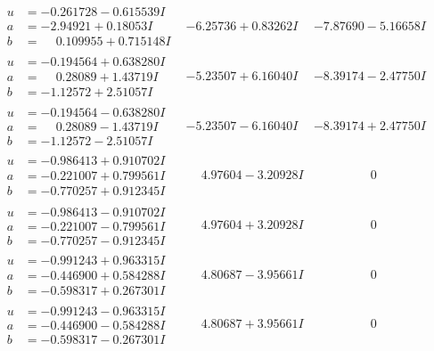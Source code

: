 \documentclass[1p]{elsarticle_modified}
\theoremstyle{definition}
\begin{document}
$$\begin{array}{c|c|c}
\begin{aligned}
u &= -0.261728 - 0.615539 I \\
a &= -2.94921 + 0.18053 I \\
b &= \phantom{-}0.109955 + 0.715148 I\end{aligned}
 & -6.25736 + 0.83262 I & -7.87690 - 5.16658 I \\ \hline\begin{aligned}
u &= -0.194564 + 0.638280 I \\
a &= \phantom{-}0.28089 + 1.43719 I \\
b &= -1.12572 + 2.51057 I\end{aligned}
 & -5.23507 + 6.16040 I & -8.39174 - 2.47750 I \\ \hline\begin{aligned}
u &= -0.194564 - 0.638280 I \\
a &= \phantom{-}0.28089 - 1.43719 I \\
b &= -1.12572 - 2.51057 I\end{aligned}
 & -5.23507 - 6.16040 I & -8.39174 + 2.47750 I \\ \hline\begin{aligned}
u &= -0.986413 + 0.910702 I \\
a &= -0.221007 + 0.799561 I \\
b &= -0.770257 + 0.912345 I\end{aligned}
 & \phantom{-}4.97604 - 3.20928 I & \phantom{-0.000000 } 0 \\ \hline\begin{aligned}
u &= -0.986413 - 0.910702 I \\
a &= -0.221007 - 0.799561 I \\
b &= -0.770257 - 0.912345 I\end{aligned}
 & \phantom{-}4.97604 + 3.20928 I & \phantom{-0.000000 } 0 \\ \hline\begin{aligned}
u &= -0.991243 + 0.963315 I \\
a &= -0.446900 + 0.584288 I \\
b &= -0.598317 + 0.267301 I\end{aligned}
 & \phantom{-}4.80687 - 3.95661 I & \phantom{-0.000000 } 0 \\ \hline\begin{aligned}
u &= -0.991243 - 0.963315 I \\
a &= -0.446900 - 0.584288 I \\
b &= -0.598317 - 0.267301 I\end{aligned}
 & \phantom{-}4.80687 + 3.95661 I & \phantom{-0.000000 } 0 \\ \hline\begin{aligned}

\end{aligned}
\end{array}$$
\end{document}
